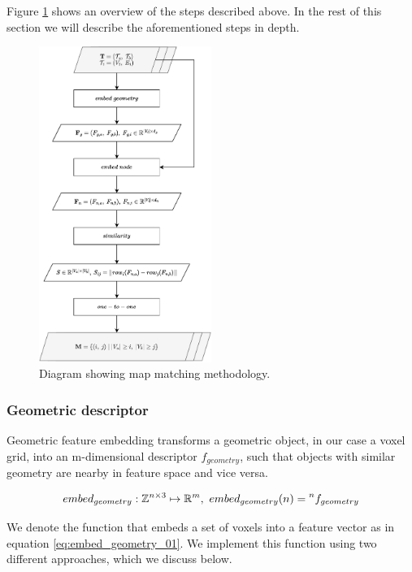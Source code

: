 Figure \ref{fig:flowchart_match} shows an overview of the steps described above. In the rest of this section we will describe the aforementioned steps in depth.

\begin{figure}[h]
    \centering
    \includegraphics*[width=0.5\textwidth]{./fig/flowchart_match.pdf}
    \caption{Diagram showing map matching methodology.}
    \label{fig:flowchart_match}
\end{figure}


\subsubsection{Geometric descriptor}
Geometric feature embedding transforms a geometric object, in our case a voxel grid, into an m-dimensional descriptor \(f_{geometry}\), such that objects with similar geometry are nearby in feature space and vice versa.

\begin{equation}
    \label{eq:embed_geometry_01}
    embed_{geometry}: \voxelset \mapsto \mathbb{R}^m,\ embed_{geometry}(n) = \prescript{n}{}{f_{geometry}}
\end{equation}

We denote the function that embeds a set of voxels into a feature vector as in equation \ref{eq:embed_geometry_01}. We implement this function using two different approaches, which we discuss below.

